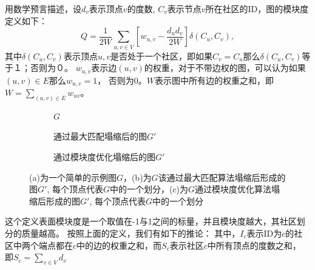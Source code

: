 \documentclass[master]{njuthesis}
\begin{document}
用数学预言描述，设$d_v$表示顶点$v$的度数, $C_v$表示节点$v$所在社区的ID，图的模块度定义如下：
\begin{equation}
\label{eq:mod}
Q = \frac{1}{2W}\sum\limits_{u, v \in V} \left[w_{u,v} - \frac{{d_u}{d_v}}{2W} \right]\delta \left(C_u, C_v\right),
\end{equation}
其中$\delta(C_u, C_v)$表示顶点$u, v$是否处于一个社区，即如果$C_v = C_u$那么$\delta(C_u, C_v)$等于１；否则为０。
$w_{u,v}$表示边$(u,v)$的权重，对于不带边权的图，可以认为如果$(u,v)\in E$那么$w_{u,v}=1$，
否则为0。$W$表示图中所有边的权重之和，即$W=\sum_{(u,v) \in E}w_{uv}$。
\begin{figure}[t]
    \centering
    \begin{subfigure}[b]{0.4\linewidth}        %
        \centering
        \label{fig:two:one}
	\resizebox{!}{!}{}
	\caption{$G$}
	\label{fig:figure2:figure1} 
	\end{subfigure}
    \begin{subfigure}[b]{0.4\linewidth}        %
     \centering
	\resizebox{!}{!}{}
	\caption{通过最大匹配塌缩后的图$G\prime$}
	\label{fig:figure2:figure2}
    \end{subfigure}
    \begin{subfigure}[b]{0.4\linewidth}        %
     \centering
	\resizebox{!}{!}{}
	\caption{通过模块度优化塌缩后的图$G\prime$}
	\label{fig:figure2:figure2}
    \end{subfigure}
    \caption{(a)为一个简单的示例图$G$，(b)为$G$该通过最大匹配算法塌缩后形成的图$G\prime$, 每个顶点代表$G$中的一个划分，(c)为$G$通过模块度优化算法塌缩后形成的图$G\prime$, 每个顶点代表$G$中的一个划分}
    \label{fig:modu_paritition}
\end{figure}
这个定义表面模块度是一个取值在-1与1之间的标量，并且模块度越大，其社区划分的质量越高。
按照上面的定义，我们有如下的推论：
其中，$I_c$表示ID为$c$的社区中两个端点都在$c$中的边的权重之和，而$S_c$表示社区$c$中所有顶点的度数之和，
即$S_c = \sum_{v \in V} {d_v}$
\end{document}
